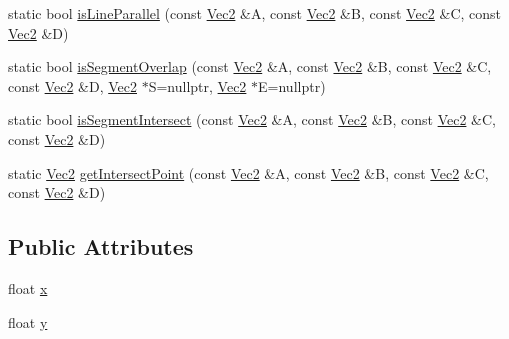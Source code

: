 \begin{DoxyCompactItemize}
static bool \hyperlink{classVec2_ac526f6ebee4db5f43652b83a3c57ddc5}{is\+Line\+Parallel} (const \hyperlink{classVec2}{Vec2} \&A, const \hyperlink{classVec2}{Vec2} \&B, const \hyperlink{classVec2}{Vec2} \&C, const \hyperlink{classVec2}{Vec2} \&D)
\item 
static bool \hyperlink{classVec2_a28c2d3ea6d0012ef5d41b024e91462ed}{is\+Segment\+Overlap} (const \hyperlink{classVec2}{Vec2} \&A, const \hyperlink{classVec2}{Vec2} \&B, const \hyperlink{classVec2}{Vec2} \&C, const \hyperlink{classVec2}{Vec2} \&D, \hyperlink{classVec2}{Vec2} $\ast$S=nullptr, \hyperlink{classVec2}{Vec2} $\ast$E=nullptr)
\item 
static bool \hyperlink{classVec2_a8c71387fe5009ce9d7c53aa705cd2e3b}{is\+Segment\+Intersect} (const \hyperlink{classVec2}{Vec2} \&A, const \hyperlink{classVec2}{Vec2} \&B, const \hyperlink{classVec2}{Vec2} \&C, const \hyperlink{classVec2}{Vec2} \&D)
\item 
static \hyperlink{classVec2}{Vec2} \hyperlink{classVec2_a6b7881ab13c3e0336ef1f77340df8b86}{get\+Intersect\+Point} (const \hyperlink{classVec2}{Vec2} \&A, const \hyperlink{classVec2}{Vec2} \&B, const \hyperlink{classVec2}{Vec2} \&C, const \hyperlink{classVec2}{Vec2} \&D)
\end{DoxyCompactItemize}
\subsection*{Public Attributes}
\begin{DoxyCompactItemize}
\item 
float \hyperlink{classVec2_adf8ee322d4b4bcc04146762c018d731f}{x}
\item 
float \hyperlink{classVec2_a30543787e62f6d915543cf1dfb04c094}{y}
\end{DoxyCompactItemize}
